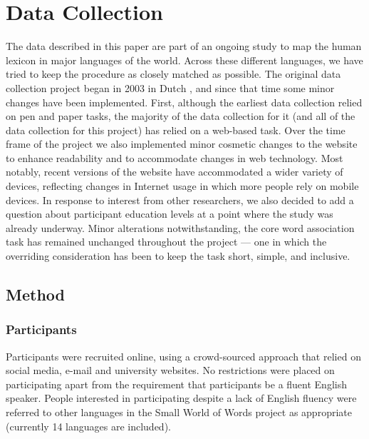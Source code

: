 \documentclass[a4paper,doc,natbib,floatsintext]{apa6}
\begin{document}
\section{Data Collection}
The data described in this paper are part of an ongoing study to map the human lexicon in major languages of the world. Across these different languages, we have tried to keep the procedure as closely matched as possible. The original data collection project began in 2003 in Dutch \citep{DeDeyne2008a,DeDeyne2013b}, and since that time some minor changes have been implemented. First, although the earliest data collection relied on pen and paper tasks, the majority of the data collection for it (and all of the data collection for this project) has relied on a web-based task.
Over the time frame of the project we also implemented minor cosmetic changes to the website to enhance readability and to accommodate changes in web technology. Most notably, recent versions of the website have accommodated a wider variety of devices, reflecting changes in Internet usage in which more people rely on mobile devices. In response to interest from other researchers, we also decided to add a question about participant education levels at a point where the study was already underway. Minor alterations notwithstanding, the core word association task has remained unchanged throughout the project --- one in which the overriding consideration has been to keep the task short, simple, and inclusive.

\subsection{Method}
\subsubsection{Participants}
Participants were recruited online, using a crowd-sourced approach that relied on social media, e-mail and university websites. No restrictions were placed on participating apart from the requirement that participants be a fluent English speaker. People interested in participating despite a lack of English fluency were referred to other languages in the Small World of Words project as appropriate (currently 14 languages are included).
\end{document}
